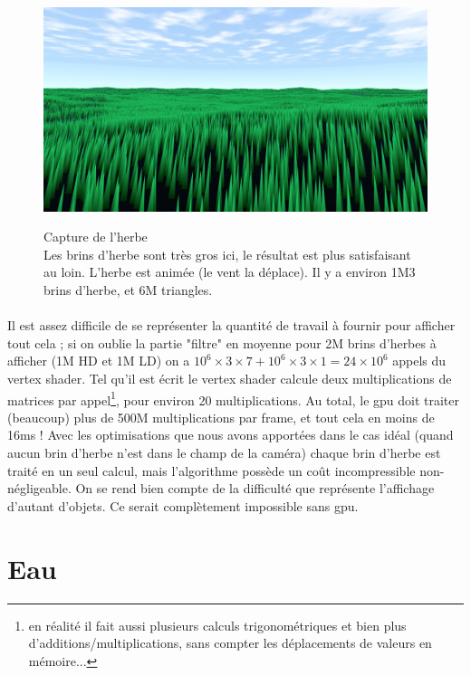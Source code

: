 \documentclass{EPUProjetDi}
\begin{document}
\begin{figure}[H]
	\centering
	\caption[Capture de l'herbe]{Capture de l'herbe\\Les brins d'herbe sont très gros ici, le résultat est plus satisfaisant au loin. L'herbe est animée (le vent la déplace). Il y a environ 1M3 brins d'herbe, et 6M triangles.}
	\includegraphics[scale=.35]{grass}
	\label{fig:grass}
\end{figure}

\paragraph{}
Il est assez difficile de se représenter la quantité de travail à fournir pour afficher tout cela ; si on oublie la partie "filtre" en moyenne pour 2M brins d'herbes à afficher (1M HD et 1M LD) on a $10^6\times3\times7 + 10^6\times3\times1=24\times10^6$ appels du vertex shader. Tel qu'il est écrit le vertex shader calcule deux multiplications de matrices par appel\footnote{en réalité il fait aussi plusieurs calculs trigonométriques et bien plus d'additions/multiplications, sans compter les déplacements de valeurs en mémoire...}, pour environ 20 multiplications. Au total, le gpu doit traiter (beaucoup) plus de 500M multiplications par frame, et tout cela en moins de 16ms ! Avec les optimisations que nous avons apportées dans le cas idéal (quand aucun brin d'herbe n'est dans le champ de la caméra) chaque brin d'herbe est traité en un seul calcul, mais l'algorithme possède un coût incompressible non-négligeable. On se rend bien compte de la difficulté que représente l'affichage d'autant d'objets. Ce serait complètement impossible sans gpu.

\section{Eau}
\end{document}
